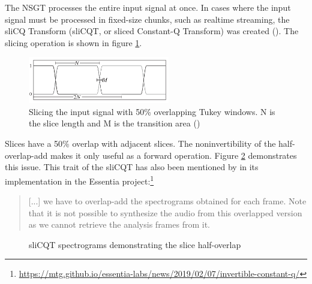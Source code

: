 \documentclass[report.tex]{subfiles}
\begin{document}
The NSGT processes the entire input signal at once. In cases where the input signal must be processed in fixed-size chunks, such as realtime streaming, the sliCQ Transform (sliCQT, or sliced Constant-Q Transform) was created (\cite{invertiblecqt, slicq}). The slicing operation is shown in figure \ref{fig:slicqtukeys}.

\begin{figure}[ht]
	\centering
	\includegraphics[width=0.55\textwidth]{./images-misc/slicq_windows.png}
	\caption{Slicing the input signal with 50\% overlapping Tukey windows. N is the slice length and M is the transition area (\cite{slicq})}
	\label{fig:slicqtukeys}
\end{figure}

Slices have a 50\% overlap with adjacent slices. The noninvertibility of the half-overlap-add makes it only useful as a forward operation. Figure \ref{fig:slicqoverlaps} demonstrates this issue. This trait of the sliCQT has also been mentioned by in its implementation in the Essentia project:\footnote{\url{https://mtg.github.io/essentia-labs/news/2019/02/07/invertible-constant-q/}}

\begin{quote}
	[...] we have to overlap-add the spectrograms obtained for each frame. Note that it is not possible to synthesize the audio from this overlapped version as we cannot retrieve the analysis frames from it.
\end{quote}

\begin{figure}[ht]
	\centering
	\hspace{0.1em}
	\caption{sliCQT spectrograms demonstrating the slice half-overlap}
	\label{fig:slicqoverlaps}
\end{figure}
\end{document}
